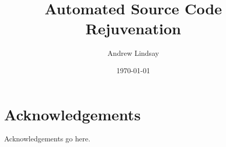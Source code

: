 \documentclass[bsc,frontabs,singlespacing,parskip,deptreport]{infthesis}
\begin{document}
\title{\vspace{-5.0cm} Automated Source Code Rejuvenation \\ \vspace{1cm}  }

\author{Andrew Lindsay}


\date{\today}

\abstract{

}

\maketitle

\section*{Acknowledgements}
Acknowledgements go here. 

\tableofcontents

\end{document}
